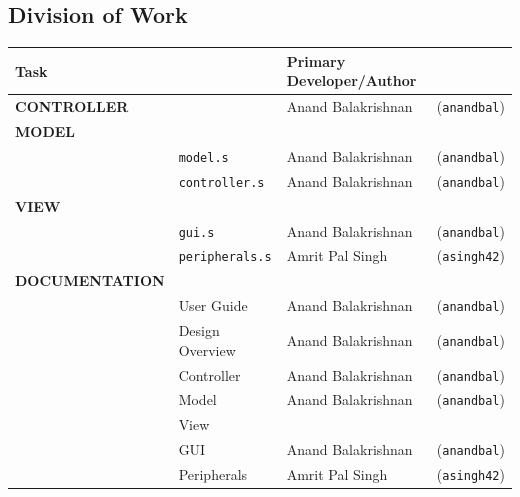 \subsection{Division of Work}

\begin{table}[H]
\centering
\begin{tabular}{|ll|ll|}
\hline
\textbf{Task}           &                       & \textbf{Primary Developer/Author}                       \\ \hline
\textbf{CONTROLLER}     &                       & Anand Balakrishnan           & (\texttt{anandbal})   \\ \hline
\textbf{MODEL}          &                       &                              &                       \\ \hline
                        & \texttt{model.s}      & Anand Balakrishnan           & (\texttt{anandbal})   \\ 
                        & \texttt{controller.s} & Anand Balakrishnan           & (\texttt{anandbal})   \\ \hline
\textbf{VIEW}           &                       &                              &                       \\ \hline
                        & \texttt{gui.s}        & Anand Balakrishnan           & (\texttt{anandbal})   \\
                        & \texttt{peripherals.s}& Amrit Pal Singh              & (\texttt{asingh42})   \\ \hline
\textbf{DOCUMENTATION}  &                              \\ \hline
                        & User Guide            & Anand Balakrishnan           & (\texttt{anandbal})   \\ \hline
                        & Design Overview       & Anand Balakrishnan           & (\texttt{anandbal})   \\ \hline
                        & Controller            & Anand Balakrishnan           & (\texttt{anandbal})   \\ \hline
                        & Model           & Anand Balakrishnan           & (\texttt{anandbal})   \\ \hline
                        & View            &                               \\ \hline
                        & GUI             & Anand Balakrishnan           & (\texttt{anandbal})   \\ \hline
                        & Peripherals     & Amrit Pal Singh              & (\texttt{asingh42})   \\ \hline
\end{tabular}
\end{table}

\newpage

\newpage

\newpage



